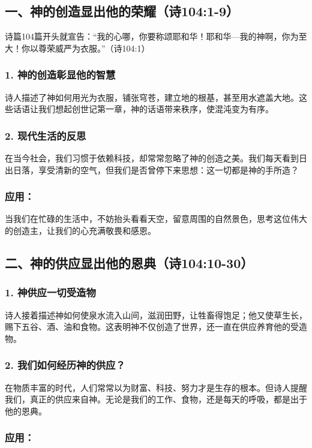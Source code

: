 \documentclass[a4paper, 12pt]{article}
\begin{document}
\subsection*{一、神的创造显出他的荣耀（诗104:1-9）}
诗篇104篇开头就宣告：“我的心哪，你要称颂耶和华！耶和华—我的神啊，你为至大！你以尊荣威严为衣服。”（诗104:1）

\subsubsection*{1. 神的创造彰显他的智慧}
诗人描述了神如何用光为衣服，铺张穹苍，建立地的根基，甚至用水遮盖大地。这些话语让我们想起创世记第一章，神的话语带来秩序，使混沌变为有序。

\subsubsection*{2. 现代生活的反思}
在当今社会，我们习惯于依赖科技，却常常忽略了神的创造之美。我们每天看到日出日落，享受清新的空气，但我们是否曾停下来思想：这一切都是神的手所造？

\subsubsection*{应用：}
当我们在忙碌的生活中，不妨抬头看看天空，留意周围的自然景色，思考这位伟大的创造主，让我们的心充满敬畏和感恩。

\subsection*{二、神的供应显出他的恩典（诗104:10-30）}
\subsubsection*{1. 神供应一切受造物}
诗人接着描述神如何使泉水流入山间，滋润田野，让牲畜得饱足；他又使草生长，赐下五谷、酒、油和食物。这表明神不仅创造了世界，还一直在供应养育他的受造物。

\subsubsection*{2. 我们如何经历神的供应？}
在物质丰富的时代，人们常常以为财富、科技、努力才是生存的根本。但诗人提醒我们，真正的供应来自神。无论是我们的工作、食物，还是每天的呼吸，都是出于他的恩典。

\subsubsection*{应用：}
\end{document}
